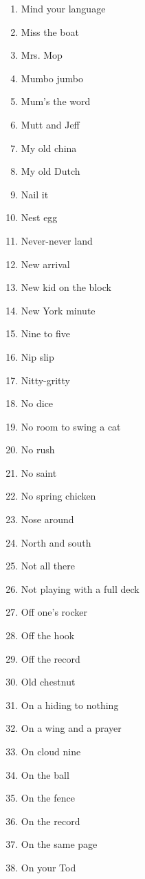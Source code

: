 \begin{enumerate}
        \item  Mind your language
        \item  Miss the boat
        \item  Mrs. Mop
        \item  Mumbo jumbo
        \item  Mum's the word
        \item  Mutt and Jeff
        \item  My old china
        \item  My old Dutch
        \item  Nail it
        \item  Nest egg
        \item  Never-never land
        \item  New arrival
        \item  New kid on the block
        \item  New York minute
        \item  Nine to five
        \item  Nip slip
        \item  Nitty-gritty
        \item  No dice
        \item  No room to swing a cat
        \item  No rush
        \item  No saint
        \item  No spring chicken
        \item  Nose around
        \item  North and south
        \item  Not all there
        \item  Not playing with a full deck
        \item  Off one's rocker
        \item  Off the hook
        \item  Off the record
        \item  Old chestnut
        \item  On a hiding to nothing
        \item  On a wing and a prayer
        \item  On cloud nine
        \item  On the ball
        \item  On the fence
        \item  On the record
        \item  On the same page
        \item  On your Tod

\end{enumerate}

